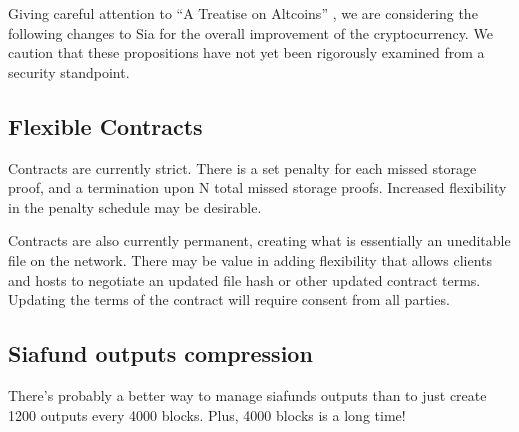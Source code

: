\documentclass[twocolumn]{article}
\begin{document}
Giving careful attention to ``A Treatise on Altcoins'' \cite{alts}, we are considering the following changes to Sia for the overall improvement of the cryptocurrency.
We caution that these propositions have not yet been rigorously examined from a security standpoint.

\subsection{Flexible Contracts}
Contracts are currently strict.
There is a set penalty for each missed storage proof, and a termination upon N total missed storage proofs.
Increased flexibility in the penalty schedule may be desirable.

Contracts are also currently permanent, creating what is essentially an uneditable file on the network.
There may be value in adding flexibility that allows clients and hosts to negotiate an updated file hash or other updated contract terms.
Updating the terms of the contract will require consent from all parties.




\subsection{Siafund outputs compression}
There's probably a better way to manage siafunds outputs than to just create 1200 outputs every 4000 blocks. Plus, 4000 blocks is a long time!
\end{document}
